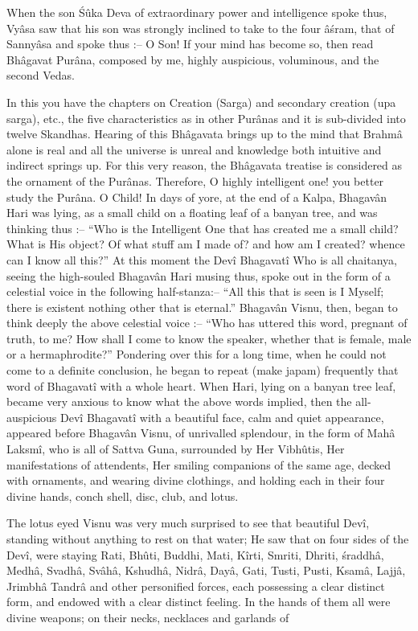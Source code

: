 When the son \'S\^uka Deva of extraordinary power and intelligence spoke thus, Vy\^asa saw that his son was strongly inclined to take to the four \^a\'sram, that of Sanny\^asa and spoke thus :-- O Son! If your mind has become so, then read Bh\^agavat Pur\^ana, composed by me, highly auspicious, voluminous, and the second Vedas.

In this you have the chapters on Creation (Sarga) and secondary creation (upa sarga), etc., the five characteristics as in other Pur\^anas and it is sub-divided into twelve Skandhas. Hearing of this Bh\^agavata brings up to the mind that Brahm\^a alone is real and all the universe is unreal and knowledge both intuitive and indirect springs up. For this very reason, the Bh\^agavata treatise is considered as the ornament of the Pur\^anas. Therefore, O highly intelligent one! you better study the Pur\^ana. O Child! In days of yore, at the end of a Kalpa, Bhagav\^an Hari was lying, as a small child on a floating leaf of a banyan tree, and was thinking thus :-- ``Who is the Intelligent One that has created me a small child? What is His object? Of what stuff am I made of? and how am I created? whence can I know all this?'' At this moment the Dev\^i Bhagavat\^i Who is all chaitanya, seeing the high-souled Bhagav\^an Hari musing thus, spoke out in the form of a celestial voice in the following half-stanza:-- ``All this that is seen is I Myself; there is existent nothing other that is eternal.'' Bhagav\^an Visnu, then, began to think deeply the above celestial voice :-- ``Who has uttered this word, pregnant of truth, to me? How shall I come to know the speaker, whether that is female, male or a hermaphrodite?'' Pondering over this for a long time, when he could not come to a definite conclusion, he began to repeat (make japam) frequently that word of Bhagavat\^i with a whole heart. When Hari, lying on a banyan tree leaf, became very anxious to know what the above words implied, then the all-auspicious Dev\^i Bhagavat\^i with a beautiful face, calm and quiet appearance, appeared before Bhagav\^an Visnu, of unrivalled splendour, in the form of Mah\^a Laksm\^i, who is all of Sattva Guna, surrounded by Her Vibh\^utis, Her manifestations of attendents, Her smiling companions of the same age, decked with ornaments, and wearing divine clothings, and holding each in their four divine hands, conch shell, disc, club, and lotus.

The lotus eyed Visnu was very much surprised to see that beautiful Dev\^i, standing without anything to rest on that water; He saw that on four sides of the Dev\^i, were staying Rati, Bh\^uti, Buddhi, Mati, K\^irti, Smriti, Dhriti, \'sraddh\^a, Medh\^a, Svadh\^a, Sv\^ah\^a, Kshudh\^a, Nidr\^a, Day\^a, Gati, Tusti, Pusti, Ksam\^a, Lajj\^a, Jrimbh\^a Tandr\^a and other personified forces, each possessing a clear distinct form, and endowed with a clear distinct feeling. In the hands of them all were divine weapons; on their necks, necklaces and garlands of

